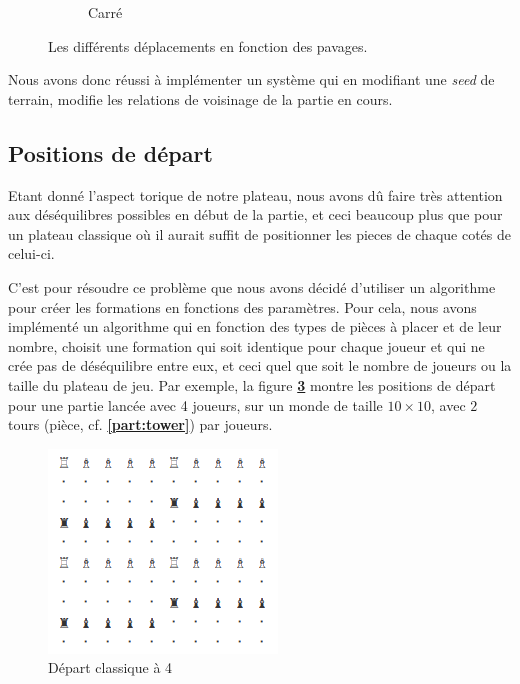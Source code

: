 \begin{figure}[H]
\begin{subfigure}{0.2\textwidth}
                \caption{Carré}
                \label{fig:dep_carre}
            \end{subfigure}
            \caption{Les différents déplacements en fonction des pavages.}
        \end{figure}
        
        Nous avons donc réussi à implémenter un système qui en modifiant une \textit{seed} de terrain, modifie les relations de voisinage de la partie en cours.
    \subsection{Positions de départ}
        Etant donné l'aspect torique de notre plateau, nous avons dû faire très attention aux déséquilibres possibles en début de la partie, et ceci beaucoup plus que pour un plateau classique où il aurait suffit de positionner les pieces de chaque cotés de celui-ci.

        C'est pour résoudre ce problème que nous avons décidé d'utiliser un algorithme pour créer les formations en fonctions des paramètres. Pour cela, nous avons implémenté un algorithme qui en fonction des types de pièces à placer et de leur nombre, choisit une formation qui soit identique pour chaque joueur et qui ne crée pas de déséquilibre entre eux, et ceci quel que soit le nombre de joueurs ou la taille du plateau de jeu. Par exemple, la figure \textbf{\ref{fig:depart_classique_a_4}} montre les positions de départ pour une partie lancée avec 4 joueurs, sur un monde de taille $10\times10$, avec  $2$ tours (pièce, cf. \textbf{\ref{part:tower}}) par joueurs.
            
            \begin{figure}[H]
                \centering
                \includegraphics[scale=0.6]{img/depart_classique_a_4.png}
                \caption{Départ classique à 4}
                \label{fig:depart_classique_a_4}
            \end{figure}

